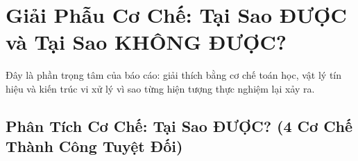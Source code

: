 \documentclass[11pt,a4paper]{article}
\begin{document}
\section{Giải Phẫu Cơ Chế: Tại Sao ĐƯỢC và Tại Sao KHÔNG ĐƯỢC?}

Đây là phần trọng tâm của báo cáo: giải thích bằng cơ chế toán học, vật lý tín hiệu và kiến trúc vi xử lý vì sao từng hiện tượng thực nghiệm lại xảy ra.

\subsection{Phân Tích Cơ Chế: Tại Sao ĐƯỢC? (4 Cơ Chế Thành Công Tuyệt Đối)}
\end{document}
